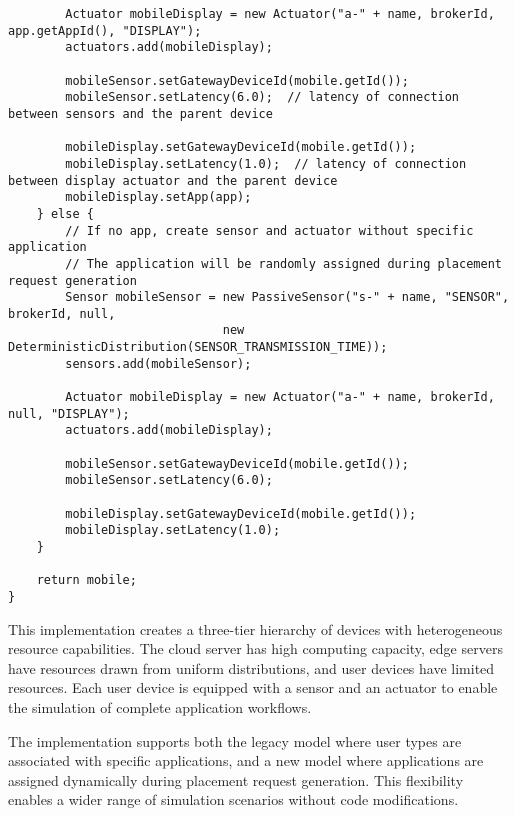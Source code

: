 \begin{verbatim}
        Actuator mobileDisplay = new Actuator("a-" + name, brokerId, app.getAppId(), "DISPLAY");
        actuators.add(mobileDisplay);

        mobileSensor.setGatewayDeviceId(mobile.getId());
        mobileSensor.setLatency(6.0);  // latency of connection between sensors and the parent device

        mobileDisplay.setGatewayDeviceId(mobile.getId());
        mobileDisplay.setLatency(1.0);  // latency of connection between display actuator and the parent device
        mobileDisplay.setApp(app);
    } else {
        // If no app, create sensor and actuator without specific application
        // The application will be randomly assigned during placement request generation
        Sensor mobileSensor = new PassiveSensor("s-" + name, "SENSOR", brokerId, null, 
                              new DeterministicDistribution(SENSOR_TRANSMISSION_TIME));
        sensors.add(mobileSensor);
        
        Actuator mobileDisplay = new Actuator("a-" + name, brokerId, null, "DISPLAY");
        actuators.add(mobileDisplay);

        mobileSensor.setGatewayDeviceId(mobile.getId());
        mobileSensor.setLatency(6.0);

        mobileDisplay.setGatewayDeviceId(mobile.getId());
        mobileDisplay.setLatency(1.0);
    }

    return mobile;
}
\end{verbatim}

This implementation creates a three-tier hierarchy of devices with heterogeneous resource capabilities. The cloud server has high computing capacity, edge servers have resources drawn from uniform distributions, and user devices have limited resources. Each user device is equipped with a sensor and an actuator to enable the simulation of complete application workflows. 

The implementation supports both the legacy model where user types are associated with specific applications, and a new model where applications are assigned dynamically during placement request generation. This flexibility enables a wider range of simulation scenarios without code modifications. 